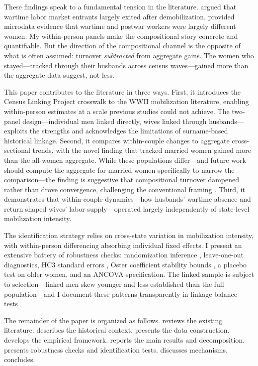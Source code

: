 \documentclass[12pt]{article}
\begin{document}
These findings speak to a fundamental tension in the literature. \citet{goldin1991role} argued that wartime labor market entrants largely exited after demobilization. \citet{rose2018rise} provided microdata evidence that wartime and postwar workers were largely different women. My within-person panels make the compositional story concrete and quantifiable. But the direction of the compositional channel is the opposite of what is often assumed: turnover \textit{subtracted} from aggregate gains. The women who stayed---tracked through their husbands across census waves---gained more than the aggregate data suggest, not less.

This paper contributes to the literature in three ways. First, it introduces the Census Linking Project crosswalk to the WWII mobilization literature, enabling within-person estimates at a scale previous studies could not achieve. The two-panel design---individual men linked directly, wives linked through husbands---exploits the strengths and acknowledges the limitations of surname-based historical linkage. Second, it compares within-couple changes to aggregate cross-sectional trends, with the novel finding that tracked married women gained more than the all-women aggregate. While these populations differ---and future work should compute the aggregate for married women specifically to narrow the comparison---the finding is suggestive that compositional turnover dampened rather than drove convergence, challenging the conventional framing \citep{goldin1991role, rose2018rise}. Third, it demonstrates that within-couple dynamics---how husbands' wartime absence and return shaped wives' labor supply---operated largely independently of state-level mobilization intensity.

The identification strategy relies on cross-state variation in mobilization intensity, with within-person differencing absorbing individual fixed effects. I present an extensive battery of robustness checks: randomization inference \citep{fisher1926arrangement, young2019channeling}, leave-one-out diagnostics, HC3 standard errors \citep{cameron2008bootstrap}, Oster coefficient stability bounds \citep{oster2019unobservable}, a placebo test on older women, and an ANCOVA specification. The linked sample is subject to selection---linked men skew younger and less established than the full population---and I document these patterns transparently in linkage balance tests.

The remainder of the paper is organized as follows.  reviews the existing literature.  describes the historical context.  presents the data construction.  develops the empirical framework.  reports the main results and decomposition.  presents robustness checks and identification tests.  discusses mechanisms.  concludes.
\end{document}
